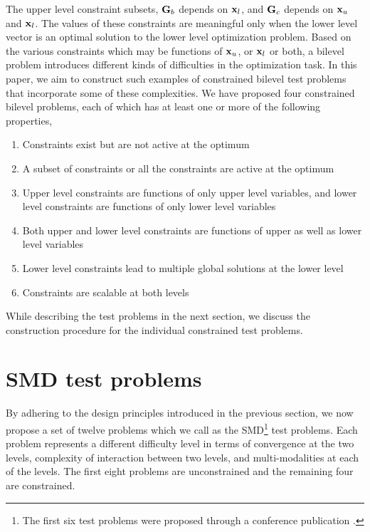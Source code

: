 \documentclass[twoside]{article}
\begin{document}
The upper level constraint subsets, $\mbox{$\mathbf{G}$}_b$ depends on $\mbox{$\mathbf{x}$}_l$, and $\mbox{$\mathbf{G}$}_c$ depends on $\mbox{$\mathbf{x}$}_u$ and $\mbox{$\mathbf{x}$}_l$. The values of these constraints are meaningful only when the lower level vector is an optimal solution to the lower level optimization problem. Based on the various constraints which may be functions of $\mbox{$\mathbf{x}$}_u$, or $\mbox{$\mathbf{x}$}_l$ or both, a bilevel problem introduces different kinds of difficulties in the optimization task. In this paper, we aim to construct such examples of constrained bilevel test problems that incorporate some of these complexities. We have proposed four constrained bilevel problems, each of which has at least one or more of the following properties,

\begin{enumerate}
\item Constraints exist but are not active at the optimum
\item A subset of constraints or all the constraints are active at the optimum
\item Upper level constraints are functions of only upper level variables, and lower level constraints are functions of only lower level variables
\item Both upper and lower level constraints are functions of upper as well as lower level variables
\item Lower level constraints lead to multiple global solutions at the lower level
\item Constraints are scalable at both levels
\end{enumerate}

While describing the test problems in the next section, we discuss the construction procedure for the individual constrained test problems.

\section{SMD test problems}\label{sec:testproblems}

By adhering to the design principles introduced in the previous section, we now propose a set of twelve problems which we call as the SMD\footnote{The first six test problems were proposed through a conference publication \citep{my-cec12a}.} test problems. Each problem represents a different difficulty level in terms of convergence at the two levels, complexity of interaction between two levels, and multi-modalities at each of the levels. The first eight problems are unconstrained and the remaining four are constrained.
\end{document}
